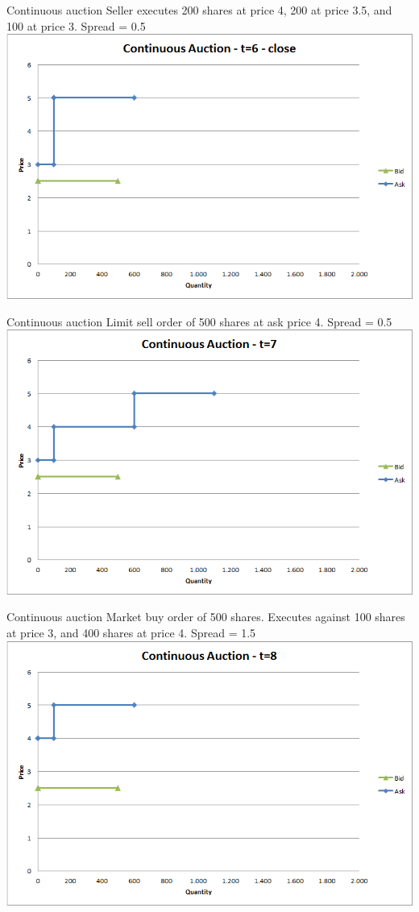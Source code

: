 \documentclass[english,10pt
,aspectratio=169
]{beamer}
\begin{document}
\begin{frame}{Continuous auction}
	Seller executes 200 shares at price 4, 200 at price 3.5, and 100 at price 3. Spread = 0.5
	\center
	\includegraphics[width=.75\linewidth]{pics/Continuous_t6close}
\end{frame}


\begin{frame}{Continuous auction}
	Limit sell order of 500 shares at ask price 4. Spread = 0.5
	\center
	\includegraphics[width=.75\linewidth]{pics/Continuous_t7}
\end{frame}


\begin{frame}{Continuous auction}
	Market buy order of 500 shares. Executes against 100 shares at price 3, and 400 shares at price 4. Spread = 1.5
	\center
	\includegraphics[width=.75\linewidth]{pics/Continuous_t8}
\end{frame}
\end{document}
